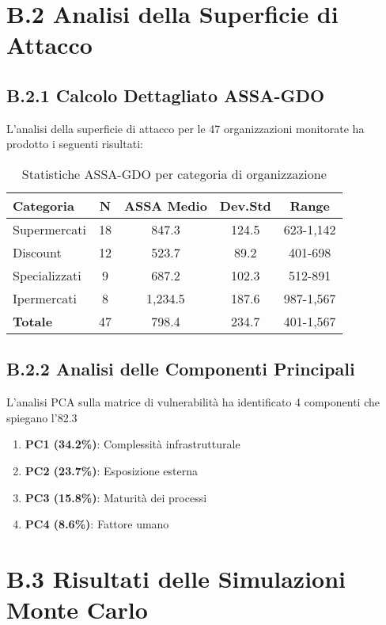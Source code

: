 \section{B.2 Analisi della Superficie di Attacco}

\subsection{B.2.1 Calcolo Dettagliato ASSA-GDO}

L'analisi della superficie di attacco per le 47 organizzazioni monitorate ha prodotto i seguenti risultati:

\begin{table}[htbp]
\centering
\caption{Statistiche ASSA-GDO per categoria di organizzazione}
\begin{tabular}{|l|c|c|c|c|}
\hline
\textbf{Categoria} & \textbf{N} & \textbf{ASSA Medio} & \textbf{Dev.Std} & \textbf{Range} \\
\hline
Supermercati & 18 & 847.3 & 124.5 & 623-1,142 \\
Discount & 12 & 523.7 & 89.2 & 401-698 \\
Specializzati & 9 & 687.2 & 102.3 & 512-891 \\
Ipermercati & 8 & 1,234.5 & 187.6 & 987-1,567 \\
\hline
\textbf{Totale} & 47 & 798.4 & 234.7 & 401-1,567 \\
\hline
\end{tabular}
\end{table}

\subsection{B.2.2 Analisi delle Componenti Principali}

L'analisi PCA sulla matrice di vulnerabilità ha identificato 4 componenti che spiegano l'82.3%

\begin{enumerate}
    \item \textbf{PC1 (34.2\%)}: Complessità infrastrutturale
    \item \textbf{PC2 (23.7\%)}: Esposizione esterna
    \item \textbf{PC3 (15.8\%)}: Maturità dei processi
    \item \textbf{PC4 (8.6\%)}: Fattore umano
\end{enumerate}

\section{B.3 Risultati delle Simulazioni Monte Carlo}

